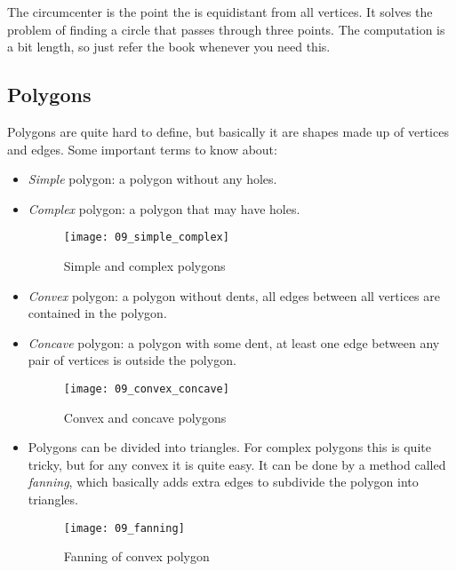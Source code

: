 The circumcenter is the point the is equidistant from all vertices. It solves the problem of finding a circle that passes through three points. The computation is a bit length, so just refer the book whenever you need this.

\subsection{Polygons}

Polygons are quite hard to define, but basically it are shapes made up of vertices and edges. Some important terms to know about:

\begin{itemize}
	\item \textit{Simple} polygon: a polygon without any holes.
	\item \textit{Complex} polygon: a polygon that may have holes.
	
\begin{figure}[H]
\centering
    \texttt{[image: 09\_simple\_complex]}
\caption{Simple and complex polygons}
\label{fig:simple-complex-polygons}
\end{figure}

	\item \textit{Convex} polygon: a polygon without dents, all edges between all vertices are contained in the polygon.
	\item \textit{Concave} polygon: a polygon with some dent, at least one edge between any pair of vertices is outside the polygon.
	
\begin{figure}[H]
\centering
    \texttt{[image: 09\_convex\_concave]}
\caption{Convex and concave polygons}
\label{fig:convex-concave-polygons}
\end{figure}	
	
	\item Polygons can be divided into triangles. For complex polygons this is quite tricky, but for any convex it is quite easy. It can be done by a method called \textit{fanning}, which basically adds extra edges to subdivide the polygon into triangles.
\begin{figure}[H]
\centering
    \texttt{[image: 09\_fanning]}
\caption{Fanning of convex polygon}
\label{fig:convex-fanning}
\end{figure}

\end{itemize}
